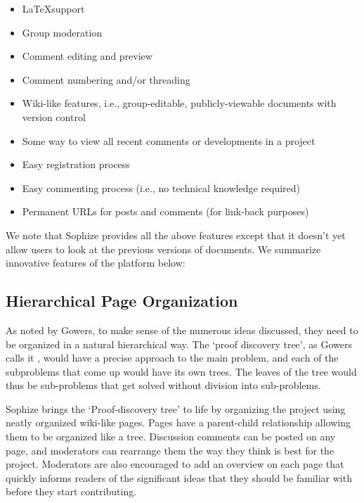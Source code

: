 \documentclass[a4paper]{article}
\begin{document}
\begin{itemize}

  \item \LaTeX\space support

  \item Group moderation

  \item Comment editing and preview

  \item Comment numbering and/or threading

  \item Wiki-like features, i.e., group-editable, publicly-viewable documents with version control

  \item Some way to view all recent comments or developments in a project

  \item Easy registration process

  \item Easy commenting process (i.e., no technical knowledge required)

  \item Permanent URLs for posts and comments (for link-back purposes)

\end{itemize}


We note that Sophize provides all the above features except that it doesn't yet allow users to look at the previous versions of documents. We summarize innovative features of the platform below:


\subsection{Hierarchical Page Organization}

As noted by Gowers, to make sense of the numerous ideas discussed, they need to be organized in a natural hierarchical way. The `proof discovery tree', as Gowers calls it \cite{gowers_weblog_2009}, would have a precise approach to the main problem, and each of the subproblems that come up would have its own trees. The leaves of the tree would thus be sub-problems that get solved without division into sub-problems.


Sophize brings the `Proof-discovery tree' to life by organizing the project using neatly organized wiki-like pages. Pages have a parent-child relationship allowing them to be organized like a tree. Discussion comments can be posted on any page, and moderators can rearrange them the way they think is best for the project. Moderators are also encouraged to add an overview on each page that quickly informs readers of the significant ideas that they should be familiar with before they start contributing.
\end{document}
